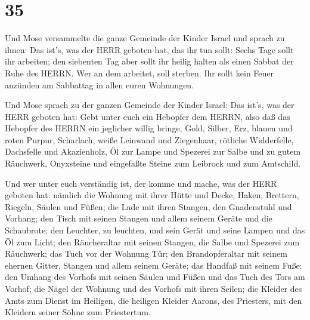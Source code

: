 \hypertarget{section-34}{%
\section{35}\label{section-34}}

 Und Mose versammelte die ganze Gemeinde der Kinder Israel
und sprach zu ihnen: Das ist's, was der HERR geboten hat, das ihr tun
sollt:  Sechs Tage sollt ihr arbeiten; den siebenten Tag
aber sollt ihr heilig halten als einen Sabbat der Ruhe des HERRN. Wer an
dem arbeitet, soll sterben.  Ihr sollt kein Feuer anzünden
am Sabbattag in allen euren Wohnungen.

 Und Mose sprach zu der ganzen Gemeinde der Kinder Israel:
Das ist's, was der HERR geboten hat:  Gebt unter euch ein
Hebopfer dem HERRN, also daß das Hebopfer des HERRN ein jeglicher willig
bringe, Gold, Silber, Erz,  blauen und roten Purpur,
Scharlach, weiße Leinwand und Ziegenhaar,  rötliche
Widderfelle, Dachsfelle und Akazienholz,  Öl zur Lampe und
Spezerei zur Salbe und zu gutem Räuchwerk,  Onyxsteine und
eingefaßte Steine zum Leibrock und zum Amtschild.

 Und wer unter euch verständig ist, der komme und mache,
was der HERR geboten hat:  nämlich die Wohnung mit ihrer
Hütte und Decke, Haken, Brettern, Riegeln, Säulen und Füßen;
 die Lade mit ihren Stangen, den Gnadenstuhl und Vorhang;
 den Tisch mit seinen Stangen und allem seinem Geräte und
die Schaubrote;  den Leuchter, zu leuchten, und sein Gerät
und seine Lampen und das Öl zum Licht;  den Räucheraltar
mit seinen Stangen, die Salbe und Spezerei zum Räuchwerk; das Tuch vor
der Wohnung Tür;  den Brandopferaltar mit seinem ehernen
Gitter, Stangen und allem seinem Geräte; das Handfaß mit seinem Fuße;
 den Umhang des Vorhofs mit seinen Säulen und Füßen und das
Tuch des Tors am Vorhof;  die Nägel der Wohnung und des
Vorhofs mit ihren Seilen;  die Kleider des Amts zum Dienst
im Heiligen, die heiligen Kleider Aarons, des Priesters, mit den
Kleidern seiner Söhne zum Priestertum.


